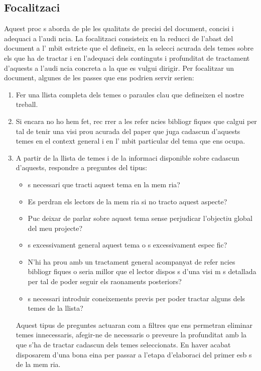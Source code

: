 \subsection{Focalitzaci } Aquest proc s aborda de ple les qualitats de precisi  del document, concisi  i adequaci  a l'audi ncia. La focalitzaci  consisteix en la reducci  de l'abast del document a l' mbit estricte que el defineix, en la selecci  acurada dels temes sobre els que ha de tractar i en l'adequaci  dels continguts i profunditat de tractament d'aquests a l'audi ncia concreta a la que es vulgui dirigir. Per focalitzar un document, algunes de les passes que ens podrien servir serien:
\begin{enumerate}
   \item Fer una llista completa dels temes o paraules clau que defineixen el nostre treball.

   \item Si encara no ho hem fet, rec rrer a les refer ncies bibliogr fiques que calgui per tal de tenir una visi  prou acurada del paper que juga cadascun d'aquests temes en el context general i en l' mbit particular del tema que ens ocupa.

   \item A partir de la llista de temes i de la informaci  disponible sobre cadascun d'aquests, respondre a preguntes del tipus:
   \begin{itemize}
          \item  s necessari que tracti aquest tema en la mem ria?
          \item Es perdran els lectors de la mem ria si no tracto aquest aspecte?
          \item Puc deixar de parlar sobre aquest tema sense perjudicar l'objectiu global del meu projecte?
          \item  s excessivament general aquest tema o  s excessivament espec fic?
          \item N'hi ha prou amb un tractament general acompanyat de refer ncies bibliogr fiques o seria millor que el lector dispos s d'una visi  m s detallada per tal de poder seguir els raonaments posteriors?
          \item  s necessari introduir coneixements previs per poder tractar alguns dels temes de la llista?
   \end{itemize}
   Aquest tipus de preguntes actuaran com a filtres que ens permetran eliminar temes innecessaris, afegir-ne de necessaris o preveure la profunditat amb la que s'ha de tractar cadascun dels temes seleccionats. En haver acabat disposarem d'una bona eina per passar a l'etapa d'elaboraci  del primer esb s de la mem ria.
\end{enumerate}

